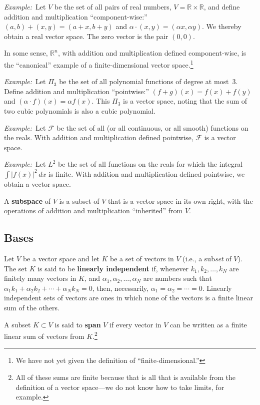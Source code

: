 \documentclass[10pt, a4paper, twocolumn]{article}
\newcommand{\R}{\mathbb{R}}
\newcommand{\defn}[1]{\textbf{#1}}
\newcommand{\eg}{\emph{Example:}\relax}
\begin{document}
\eg\ Let $V$ be the set of all pairs of real numbers, $V = \R \times \R$, and define addition and
multiplication “component-wise:” $(a, b) + (x, y) = (a + x, b + y)$ and $\alpha \cdot (x, y) = (\alpha x, \alpha y)$. We
thereby obtain a real vector space. The zero vector is the pair $(0, 0)$.

In some sense, $\R^n$, with addition and multiplication defined component-wise, is the “canonical”
example of a finite-dimensional vector space.\footnote{We have not yet given the definition of
  “finite-dimensional.”}

\eg\ Let $\Pi_3$ be the set of all polynomial functions of degree at most~3. Define addition and
multiplication “pointwise:” $(f + g)(x) = f(x) + f(y)$ and $(\alpha \cdot f)(x) = \alpha f(x)$. This $\Pi_3$ is a vector
space, noting that the sum of two cubic polynomials is also a cubic polynomial.

\eg\ Let $\mathcal{F}$ be the set of all (or all continuous, or all smooth) functions on the reals. With
addition and multiplication defined pointwise, $\mathcal{F}$ is a vector space.

\eg\ Let $L^2$ be the set of all functions on the reals for which the integral $\int |f(x)|^2\,dx$
is finite. With addition and multiplication defined pointwise, we obtain a vector space.  

A \defn{subspace} of $V$ is a subset of $V$ that is a vector space in its own right, with the
operations of addition and multiplication “inherited” from $V$.


\subsection{Bases}
Let $V$ be a vector space and let $K$ be a set of vectors in $V$ (i.e., a sub\emph{set} of $V$). The
set $K$ is said to be \defn{linearly independent} if, whenever $k_1, k_2, \dotsc, k_N$ are finitely
many vectors in $K$, and $\alpha_1, \alpha_2, \dotsc, \alpha_N$ are numbers such that $\alpha_1 k_1 + \alpha_2 k_2 + \dotsb +
\alpha_N k_N = 0$, then, necessarily, $\alpha_1 = \alpha_2 = \dotsb = 0$. Linearly independent sets of vectors are
ones in which none of the vectors is a finite linear sum of the others.

A subset $K \subset V$ is said to \defn{span} $V$ if every vector in $V$ can be written as a finite linear sum
of vectors from $K$.\footnote{All of these sums are finite because that is all that is available from
  the definition of a vector space---we do not know how to take limits, for example.}
\end{document}
